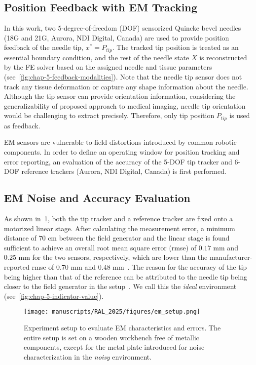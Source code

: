 \subsection{Position Feedback with EM Tracking}
\label{sec:chap-5-position-feedback}
In this work, two 5-degree-of-freedom (DOF) sensorized Quincke bevel needles (18G and 21G, Aurora, NDI Digital, Canada) are used to provide position feedback of the needle tip, $x^{*} = P_{tip}$. The tracked tip position is treated as an essential boundary condition, and the rest of the needle state $X$ is reconstructed by the FE solver based on the assigned needle and tissue parameters (see~\cref{fig:chap-5-feedback-modalities}). Note that the needle tip sensor does not track any tissue deformation or capture any shape information about the needle. Although the tip sensor can provide orientation information, considering the generalizability of proposed approach to medical imaging, needle tip orientation would be challenging to extract precisely. Therefore, only tip position $P_{tip}$ is used as feedback.

EM sensors are vulnerable to field distortions introduced by common robotic components. In order to define an operating window for position tracking and error reporting, an evaluation of the accuracy of the 5-DOF tip tracker and 6-DOF reference trackers (Aurora, NDI Digital, Canada) is first performed.

\subsection{EM Noise and Accuracy Evaluation}
\label{sec:chap-5-em-evaluation}

As shown in~\cref{fig:chap-5-em-setup}, both the tip tracker and a reference tracker are fixed onto a motorized linear stage. After calculating the measurement error, a minimum distance of $70$ cm between the field generator and the linear stage is found sufficient to achieve an overall root mean square error (rmse) of $0.17$ mm and $0.25$ mm for the two sensors, respectively, which are lower than the manufacturer-reported rmse of $0.70$ mm and $0.48$ mm~\parencite{AuroraNDIsPremier2024}. The reason for the accuracy of the tip being higher than that of the reference can be attributed to the needle tip being closer to the field generator in the setup~\parencite{nakamotoMagnetoOpticHybrid3D2000}. We call this the \textit{ideal} environment (see~\cref{fig:chap-5-indicator-value}).

\begin{figure}[h]
  \centering
  \texttt{[image: manuscripts/RAL\_2025/figures/em\_setup.png]}
  \caption{Experiment setup to evaluate EM characteristics and errors. The entire setup is set on a wooden workbench free of metallic components, except for the metal plate introduced for noise characterization in the \textit{noisy} environment.}
  \label{fig:chap-5-em-setup}
\end{figure}

